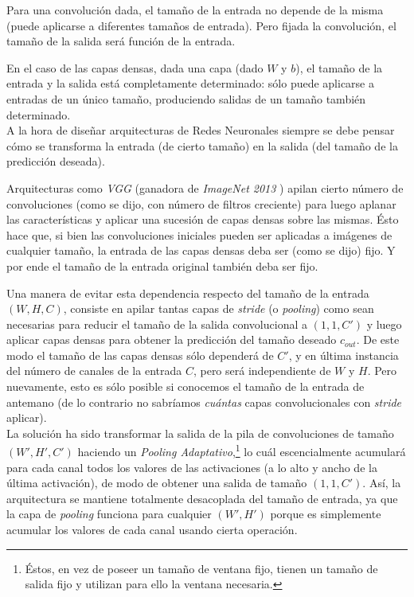 Para una convolución dada, el tamaño de la entrada no depende de la misma (puede aplicarse a diferentes tamaños de entrada). Pero fijada la convolución, el tamaño de la salida será función de la entrada.

En el caso de las capas densas, dada una capa (dado $W$ y $b$), el tamaño de la entrada y la salida está completamente determinado: sólo puede aplicarse a entradas de un único tamaño, produciendo salidas de un tamaño también determinado. \\

A la hora de diseñar arquitecturas de Redes Neuronales siempre se debe pensar cómo se transforma la entrada (de cierto tamaño) en la salida (del tamaño de la predicción deseada).

Arquitecturas como \textit{VGG} (ganadora de \textit{ImageNet 2013} \cite{vgg}) apilan cierto número de convoluciones (como se dijo, con número de filtros creciente) para luego aplanar las características y aplicar una sucesión de capas densas sobre las mismas. Ésto hace que, si bien las convoluciones iniciales pueden ser aplicadas a imágenes de cualquier tamaño, la entrada de las capas densas deba ser (como se dijo) fijo. Y por ende el tamaño de la entrada original también deba ser fijo.

Una manera de evitar esta dependencia respecto del tamaño de la entrada $(W,H,C)$, consiste en apilar tantas capas de \textit{stride} (o \textit{pooling}) como sean necesarias para reducir el tamaño de la salida convolucional a $(1,1,C')$ y luego aplicar capas densas para obtener la predicción del tamaño deseado $c_{out}$. De este modo el tamaño de las capas densas sólo dependerá de $C'$, y en última instancia del número de canales de la entrada $C$, pero será independiente de $W$ y $H$.  Pero nuevamente, esto es sólo posible si conocemos el tamaño de la entrada de antemano (de lo contrario no sabríamos \textit{cuántas} capas convolucionales con \textit{stride} aplicar).\\

La solución ha sido transformar la salida de la pila de convoluciones de tamaño $(W',H',C')$ haciendo un \textit{Pooling Adaptativo},\footnote{Éstos, en vez de poseer un tamaño de ventana fijo, tienen un tamaño de salida fijo y utilizan para ello la ventana necesaria.} lo cuál escencialmente acumulará para cada canal todos los valores de las activaciones (a lo alto y ancho de la última activación), de modo de obtener una salida de tamaño $(1,1,C')$. Así, la arquitectura se mantiene totalmente desacoplada del tamaño de entrada, ya que la capa de \textit{pooling} funciona para cualquier $(W',H')$ porque es simplemente acumular los valores de cada canal usando cierta operación. 

